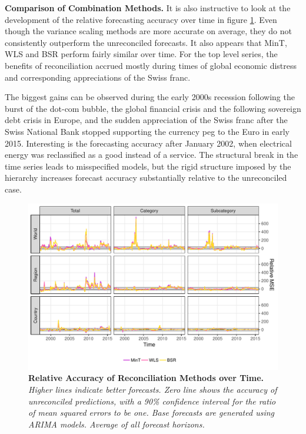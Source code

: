 \documentclass[a4paper,fleqn,11pt]{article}
\begin{document}
\noindent\textbf{Comparison of Combination Methods.} It is also instructive to look at the development of the relative forecasting accuracy over time in figure \ref{fig:rmse_time}. Even though the variance scaling methods are more accurate on average, they do not consistently outperform the unreconciled forecasts. It also appears that MinT, WLS and BSR perform fairly similar over time. For the top level series, the benefits of reconciliation accrued mostly during times of global economic distress and corresponding appreciations of the Swiss franc.

The biggest gains can be observed during the early 2000s recession following the burst of the dot-com bubble, the global financial crisis and the following sovereign debt crisis in Europe, and the sudden appreciation of the Swiss franc after the Swiss National Bank stopped supporting the currency peg to the Euro in early 2015. Interesting is the forecasting accuracy after January 2002, when electrical energy was reclassified as a good instead of a service. The structural break in the time series leads to misspecified models, but the rigid structure imposed by the hierarchy increases forecast accuracy substantially relative to the unreconciled case.\\
\begin{figure}[H]
	\includegraphics[width=\textwidth]{fig/fig_eval_rmse_time}
	\caption[Relative Accuracy of Reconciliation Methods over Time]{\textbf{Relative Accuracy of Reconciliation Methods over Time.} \small{\textit{Higher lines indicate better forecasts. Zero line shows the accuracy of unreconciled predictions, with a 90\% confidence interval for the ratio of mean squared errors to be one. Base forecasts are generated using ARIMA models. Average of all forecast horizons.}}} \label{fig:rmse_time}
\end{figure}
\end{document}

